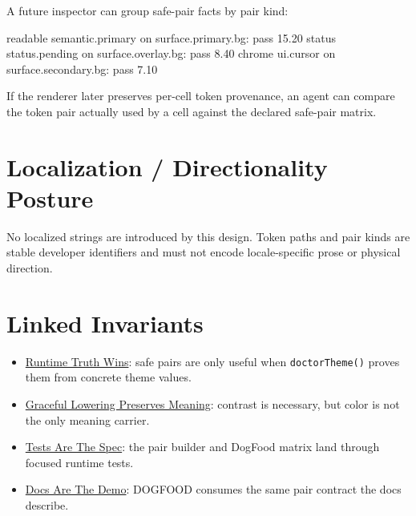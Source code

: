 A future inspector can group safe-pair facts by pair kind:

\begin{CodeBlock}
readable semantic.primary on surface.primary.bg: pass 15.20
status status.pending on surface.overlay.bg: pass 8.40
chrome ui.cursor on surface.secondary.bg: pass 7.10
\end{CodeBlock}

If the renderer later preserves per-cell token provenance, an agent can compare the token pair actually used by a cell against the declared safe-pair matrix.

\section{Localization / Directionality Posture}\label{record-180-localization-directionality-posture}

No localized strings are introduced by this design. Token paths and pair kinds are stable developer identifiers and must not encode locale-specific prose or physical direction.

\section{Linked Invariants}\label{record-180-linked-invariants}

\begin{itemize}
\tightlist
\item
  \href{https://github.com/flyingrobots/bijou/blob/cbd70612140e7a450d764b3c7be1c6af878b99bc/docs/invariants/runtime-truth-wins.md}{Runtime Truth Wins}: safe pairs are only useful when \texttt{d\allowbreak{}o\allowbreak{}c\allowbreak{}t\allowbreak{}o\allowbreak{}r\allowbreak{}T\allowbreak{}h\allowbreak{}e\allowbreak{}m\allowbreak{}e\allowbreak{}(\allowbreak{})} proves them from concrete theme values.
\item
  \href{https://github.com/flyingrobots/bijou/blob/cbd70612140e7a450d764b3c7be1c6af878b99bc/docs/invariants/graceful-lowering-preserves-meaning.md}{Graceful Lowering Preserves Meaning}: contrast is necessary, but color is not the only meaning carrier.
\item
  \href{https://github.com/flyingrobots/bijou/blob/cbd70612140e7a450d764b3c7be1c6af878b99bc/docs/invariants/tests-are-the-spec.md}{Tests Are The Spec}: the pair builder and DogFood matrix land through focused runtime tests.
\item
  \href{https://github.com/flyingrobots/bijou/blob/cbd70612140e7a450d764b3c7be1c6af878b99bc/docs/invariants/docs-are-the-demo.md}{Docs Are The Demo}: DOGFOOD consumes the same pair contract the docs describe.
\end{itemize}

